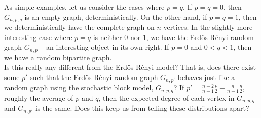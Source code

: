 \documentclass[11pt,letterpaper]{report}
\begin{document}

As simple examples, let us consider the cases where $p = q$. If $p = q = 0$, then $G_{n, p, q}$ is an empty graph, deterministically. On the other hand, if $p = q = 1$, then we deterministically have the complete graph on $n$ vertices. In the slightly more interesting case where $p = q$ is neither 0 nor 1, we have the Erd\H{os}-R\'enyi random graph $G_{n, p}$ -- an interesting object in its own right. If $p=0$ and $0<q<1$, then we have a random bipartite graph.\\



Is this really any different from the Erd\H{os}-R\'enyi model? That is, does there exist some $p'$ such that the Erd\H{os}-R\'enyi random graph $G_{n, p'}$ behaves just like a random graph using the stochastic block model, $G_{n, p, q}$? If $p' = \frac{n-2}{n-1}\frac{p}{2} + \frac{n}{n-1}\frac{q}{2}$, roughly the average of $p$ and $q$, then the expected degree of each vertex in $G_{n, p,q}$ and $G_{n, p'}$ is the same. Does this keep us from telling these distributions apart?\\

\end{document}
